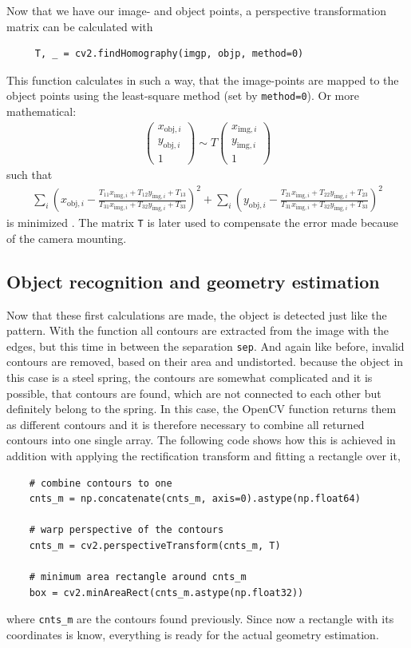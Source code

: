 Now that we have our image- and object points, a perspective transformation matrix can be calculated with
\begin{lstlisting}
	 T, _ = cv2.findHomography(imgp, objp, method=0)
\end{lstlisting}
This function calculates  in such a way, that the image-points are mapped to the object points using the least-square method (set by \texttt{method=0}).
Or more mathematical:
\begin{align*}
	\begin{pmatrix}
	x_{\text{obj}, i}\\
	y_{\text{obj}, i}\\
	1
	\end{pmatrix}\sim T
	\begin{pmatrix}
	x_{\text{img}, i}\\
	y_{\text{img}, i}\\
	1
	\end{pmatrix}	
\end{align*}
such that
\begin{align*}
	\sum_{i}\left(x_{\text{obj},i}-\frac{T_{11}x_{\text{img},i}+T_{12}y_{\text{img},i}+T_{13}}{T_{31}x_{\text{img},i}+T_{32}y_{\text{img},i}+T_{33}}\right)^2+
	\sum_{i}\left(y_{\text{obj},i}-\frac{T_{21}x_{\text{img},i}+T_{22}y_{\text{img},i}+T_{23}}{T_{31}x_{\text{img},i}+T_{32}y_{\text{img},i}+T_{33}}\right)^2
\end{align*}
is minimized \cite{cv_calib}.
The matrix \texttt{T} is later used to compensate the error made because of the camera mounting. 

\subsection{Object recognition and geometry estimation}
Now that these first calculations are made, the object is detected just like the pattern.
With the function  all contours are extracted from the image with the edges, but this time in between the separation \texttt{sep}.
And again like before, invalid contours are removed, based on their area and undistorted.
because the object in this case is a steel spring, the contours are somewhat complicated and it is possible, that contours are found, which are not connected to each other but definitely belong to the spring.
In this case, the OpenCV function returns them as different contours and it is therefore necessary to combine all returned contours into one single array.
The following code shows how this is achieved in addition with applying the rectification transform and fitting a rectangle over it,
\begin{lstlisting}
	# combine contours to one
	cnts_m = np.concatenate(cnts_m, axis=0).astype(np.float64)
	
	# warp perspective of the contours
	cnts_m = cv2.perspectiveTransform(cnts_m, T)
	
	# minimum area rectangle around cnts_m
	box = cv2.minAreaRect(cnts_m.astype(np.float32))
\end{lstlisting}
where \texttt{cnts\_m} are the contours found previously.
Since now a rectangle with its coordinates is know, everything is ready for the actual geometry estimation.

